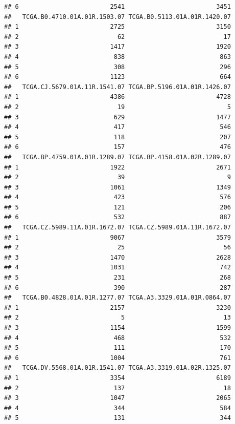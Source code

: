 \documentclass[
]{article}
\begin{document}
\begin{verbatim}
## 6                         2541                         3451
##   TCGA.B0.4710.01A.01R.1503.07 TCGA.B0.5113.01A.01R.1420.07
## 1                         2725                         3150
## 2                           62                           17
## 3                         1417                         1920
## 4                          838                          863
## 5                          308                          296
## 6                         1123                          664
##   TCGA.CJ.5679.01A.11R.1541.07 TCGA.BP.5196.01A.01R.1426.07
## 1                         4386                         4728
## 2                           19                            5
## 3                          629                         1477
## 4                          417                          546
## 5                          118                          207
## 6                          157                          476
##   TCGA.BP.4759.01A.01R.1289.07 TCGA.BP.4158.01A.02R.1289.07
## 1                         1922                         2671
## 2                           39                            9
## 3                         1061                         1349
## 4                          423                          576
## 5                          121                          206
## 6                          532                          887
##   TCGA.CZ.5989.11A.01R.1672.07 TCGA.CZ.5989.01A.11R.1672.07
## 1                         9067                         3579
## 2                           25                           56
## 3                         1470                         2628
## 4                         1031                          742
## 5                          231                          268
## 6                          390                          287
##   TCGA.B0.4828.01A.01R.1277.07 TCGA.A3.3329.01A.01R.0864.07
## 1                         2157                         3230
## 2                            5                           13
## 3                         1154                         1599
## 4                          468                          532
## 5                          111                          170
## 6                         1004                          761
##   TCGA.DV.5568.01A.01R.1541.07 TCGA.A3.3319.01A.02R.1325.07
## 1                         3354                         6189
## 2                          137                           18
## 3                         1047                         2065
## 4                          344                          584
## 5                          131                          344

\end{verbatim}
\end{document}
